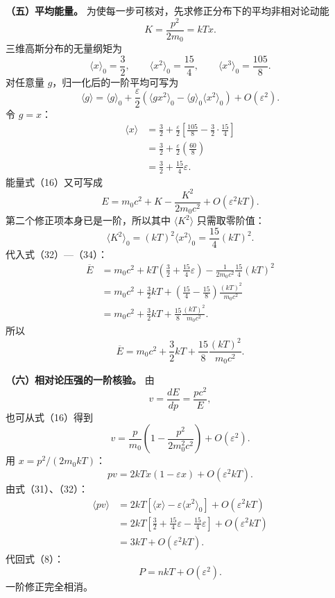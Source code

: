 \documentclass[12pt,a4paper,UTF8]{ctexart}
\begin{document}
\textbf{（五）平均能量。}
为使每一步可核对，先求修正分布下的平均非相对论动能 \[
K=\frac{p^2}{2m_0}=kTx. \tag{29}
\] 三维高斯分布的无量纲矩为 \[
\langle x\rangle_0=\frac32,\qquad
\langle x^2\rangle_0=\frac{15}{4},\qquad
\langle x^3\rangle_0=\frac{105}{8}. \tag{30}
\] 对任意量 \(g\)，归一化后的一阶平均可写为 \[
\langle g\rangle
=\langle g\rangle_0
+\frac{\varepsilon}{2}
\left(
\langle gx^2\rangle_0
-\langle g\rangle_0\langle x^2\rangle_0
\right)
+O(\varepsilon^2). \tag{31}
\] 令 \(g=x\)： \[
\begin{aligned}
\langle x\rangle
&=\frac32+\frac{\varepsilon}{2}
\left[
\frac{105}{8}
-\frac32\cdot\frac{15}{4}
\right]\\
&=\frac32+\frac{\varepsilon}{2}
\left(\frac{60}{8}\right)\\
&=\frac32+\frac{15}{4}\varepsilon.
\end{aligned} \tag{32}
\] 能量式（16）又可写成 \[
E=m_0c^2+K-\frac{K^2}{2m_0c^2}
+O(\varepsilon^2kT). \tag{33}
\] 第二个修正项本身已是一阶，所以其中 \(\langle K^2\rangle\)
只需取零阶值： \[
\langle K^2\rangle_0
=(kT)^2\langle x^2\rangle_0
=\frac{15}{4}(kT)^2. \tag{34}
\] 代入式（32）---（34）： \[
\begin{aligned}
\overline E
&=m_0c^2
+kT\left(\frac32+\frac{15}{4}\varepsilon\right)
-\frac1{2m_0c^2}\frac{15}{4}(kT)^2\\
&=m_0c^2+\frac32kT
+\left(\frac{15}{4}-\frac{15}{8}\right)
\frac{(kT)^2}{m_0c^2}\\
&=m_0c^2+\frac32kT
+\frac{15}{8}\frac{(kT)^2}{m_0c^2}.
\end{aligned} \tag{35}
\] 所以 \[
\boxed{
\overline E
=m_0c^2+\frac32kT
+\frac{15}{8}\frac{(kT)^2}{m_0c^2}
}. \tag{36}
\]

\textbf{（六）相对论压强的一阶核验。} 由 \[
v=\frac{dE}{dp}
=\frac{pc^2}{E}, \tag{37}
\] 也可从式（16）得到 \[
v=\frac p{m_0}
\left(1-\frac{p^2}{2m_0^2c^2}\right)
+O(\varepsilon^2). \tag{38}
\] 用 \(x=p^2/(2m_0kT)\)： \[
pv=2kTx(1-\varepsilon x)+O(\varepsilon^2kT). \tag{39}
\] 由式（31）、（32）： \[
\begin{aligned}
\langle pv\rangle
&=2kT
\left[
\langle x\rangle
-\varepsilon\langle x^2\rangle_0
\right]
+O(\varepsilon^2kT)\\
&=2kT
\left[
\frac32+\frac{15}{4}\varepsilon
-\frac{15}{4}\varepsilon
\right]
+O(\varepsilon^2kT)\\
&=3kT+O(\varepsilon^2kT).
\end{aligned} \tag{40}
\] 代回式（8）： \[
\boxed{
P=nkT+O(\varepsilon^2)
}. \tag{41}
\] 一阶修正完全相消。
\end{document}
